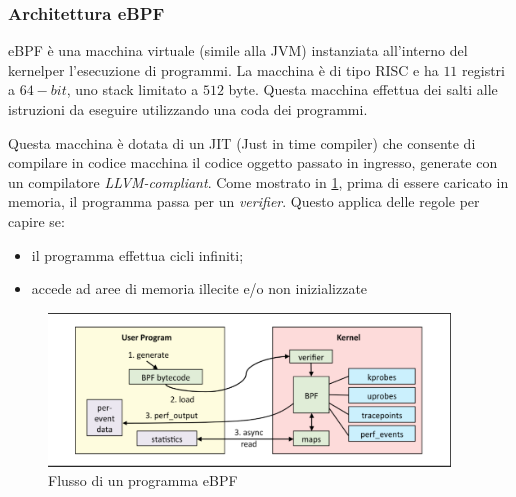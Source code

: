\documentclass{article}
\begin{document}
\subsubsection{Architettura eBPF}
eBPF è una macchina virtuale (simile alla JVM) instanziata all'interno del kernelper l'esecuzione di programmi. La macchina è di tipo RISC e ha $11$ registri a $64-bit$, uno stack limitato a $512$ byte. Questa macchina effettua dei salti alle istruzioni da eseguire utilizzando una coda dei programmi.

Questa macchina è dotata di un JIT (Just in time compiler) che consente di compilare in codice macchina il codice oggetto passato in ingresso, generate con un compilatore \textit{LLVM-compliant}. Come mostrato in \cref{fig:ebpf_arch}, prima di essere caricato in memoria, il programma passa per un \textit{verifier}. Questo applica delle regole per capire se:
\begin{itemize}
  \item il programma effettua cicli infiniti;
  \item accede ad aree di memoria illecite e/o non inizializzate
\end{itemize}

\begin{figure}
  \begin{center}
    \includegraphics[width=0.95\textwidth]{./figures/ch2/ebpf_arch.png}
  \end{center}
  \caption{Flusso di un programma eBPF}\label{fig:ebpf_arch}
\end{figure}
\end{document}
